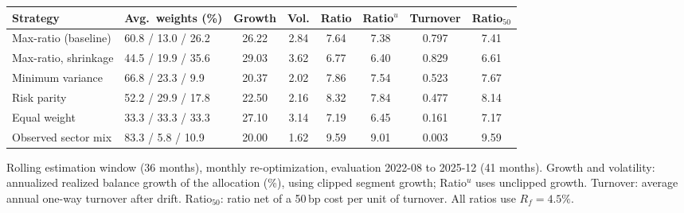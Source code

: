 \begin{tabular}{llcccccc}
\toprule
\textbf{Strategy} & Avg.\ weights (\%) & Growth & Vol. & Ratio & Ratio$^{u}$ & Turnover & Ratio$_{50}$ \\
\midrule
Max-ratio (baseline) & 60.8 / 13.0 / 26.2 & 26.22 & 2.84 & 7.64 & 7.38 & 0.797 & 7.41 \\
Max-ratio, shrinkage & 44.5 / 19.9 / 35.6 & 29.03 & 3.62 & 6.77 & 6.40 & 0.829 & 6.61 \\
Minimum variance & 66.8 / 23.3 / 9.9 & 20.37 & 2.02 & 7.86 & 7.54 & 0.523 & 7.67 \\
Risk parity & 52.2 / 29.9 / 17.8 & 22.50 & 2.16 & 8.32 & 7.84 & 0.477 & 8.14 \\
Equal weight & 33.3 / 33.3 / 33.3 & 27.10 & 3.14 & 7.19 & 6.45 & 0.161 & 7.17 \\
Observed sector mix & 83.3 / 5.8 / 10.9 & 20.00 & 1.62 & 9.59 & 9.01 & 0.003 & 9.59 \\
\bottomrule
\end{tabular}
\par\smallskip\parbox{\linewidth}{\footnotesize Rolling estimation window (36 months), monthly re-optimization, evaluation 2022-08 to 2025-12 (41 months). Growth and volatility: annualized realized balance growth of the allocation (\%), using clipped segment growth; Ratio$^{u}$ uses unclipped growth. Turnover: average annual one-way turnover after drift. Ratio$_{50}$: ratio net of a 50\,bp cost per unit of turnover. All ratios use $R_f = 4.5\%$.}
